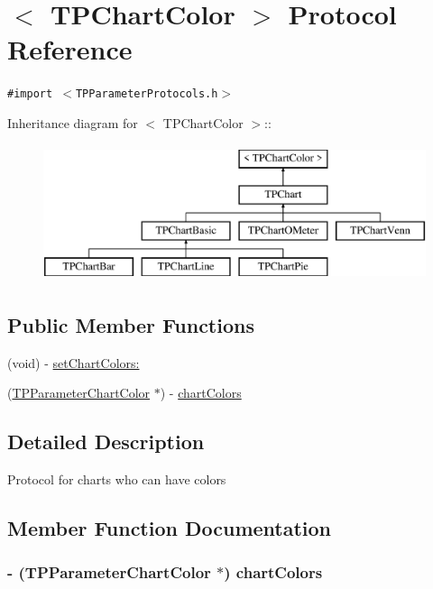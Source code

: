 \hypertarget{protocol_t_p_chart_color-p}{
\section{$<$ TPChartColor $>$ Protocol Reference}
\label{protocol_t_p_chart_color-p}
}
{\tt \#import $<$TPParameterProtocols.h$>$}

Inheritance diagram for $<$ TPChartColor $>$::\begin{figure}[H]
\begin{center}
\leavevmode
\includegraphics[height=4cm]{protocol_t_p_chart_color-p}
\end{center}
\end{figure}
\subsection*{Public Member Functions}
\begin{CompactItemize}
\item 
(void) - \hyperlink{protocol_t_p_chart_color-p_cce9d732cc3fd7f56a1e14fb73e8a1cb}{setChartColors:}
\item 
(\hyperlink{interface_t_p_parameter_chart_color}{TPParameterChartColor} $\ast$) - \hyperlink{protocol_t_p_chart_color-p_9af2239dc0deabe603fd194828b435e1}{chartColors}
\end{CompactItemize}


\subsection{Detailed Description}
Protocol for charts who can have colors 

\subsection{Member Function Documentation}
\hypertarget{protocol_t_p_chart_color-p_9af2239dc0deabe603fd194828b435e1}{
\subsubsection[{chartColors}]{\setlength{\rightskip}{0pt plus 5cm}- ({\bf TPParameterChartColor} $\ast$) chartColors }}
\label{protocol_t_p_chart_color-p_9af2239dc0deabe603fd194828b435e1}


